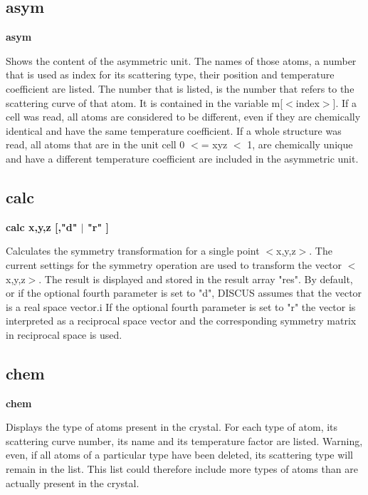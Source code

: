 \subsection*{asym}
{\bf asym \par }
\par
\vspace{3pt}
Shows the content of the asymmetric unit. The names of those atoms, 
a number that is used as index for its scattering type, their position 
and temperature coefficient are listed. The number that is listed, 
is the number that refers to the scattering curve of that atom. It is 
contained in the variable m[$ <$index$> $]. If a cell was read, all atoms 
are considered to be different, even if they are chemically identical 
and have the same temperature coefficient. If a whole structure was 
read, all atoms that are in the unit cell 0 $ <$= xyz $ <$ 1, are chemically 
unique and have a different temperature coefficient are included in 
the asymmetric unit. 
\subsection*{calc}
{\bf calc x,y,z [,"d" $| $ "r" ] \par }
\par
\vspace{3pt}
Calculates the symmetry transformation for a single point $ <$x,y,z$> $. 
The current settings for the symmetry operation are used to transform 
the vector $ <$x,y,z$> $. The result is displayed and stored in the result 
array "res". 
By default, or if the optional fourth parameter is set to "d", DISCUS 
assumes that the vector is a real space vector.i 
If the optional fourth parameter is set to "r" the vector is interpreted 
as a reciprocal space vector and the corresponding symmetry matrix in 
reciprocal space is used. 
\subsection*{chem}
{\bf chem \par }
\par
\vspace{3pt}
Displays the type of atoms present in the crystal. For each type of 
atom, its scattering curve number, its name and its temperature 
factor are listed. 
Warning, even, if all atoms of a particular type have been deleted, its 
scattering type will remain in the list. This list could therefore 
include more types of atoms than are actually present in the crystal. 
